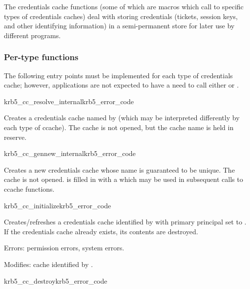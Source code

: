 The credentials cache functions (some of which are macros which call to
specific types of credentials caches) deal with storing credentials
(tickets, session keys, and other identifying information) in a
semi-permanent store for later use by different programs.

\subsubsection{Per-type functions}
The following entry points must be implemented for each type of
credentials cache; however, applications are not expected to have a need
to call either  or
.


\begin{funcdecl}{krb5_cc_resolve_internal}{krb5_error_code}{\funcout}
\funcin
{}
\end{funcdecl}

Creates a credentials cache named by  (which may be
interpreted differently by each type of ccache).  The cache is not
opened, but the cache name is held in reserve.

\begin{funcdecl}{krb5_cc_gennew_internal}{krb5_error_code}{\funcout}
\end{funcdecl}

Creates a new credentials cache whose name is guaranteed to be
unique.  The cache is not opened.  is
filled in with a  which may be used in subsequent
calls to ccache functions.

\begin{funcdecl}{krb5_cc_initialize}{krb5_error_code}{\funcinout}
\funcin
{}
\end{funcdecl}

Creates/refreshes a credentials cache identified by  with
primary principal set to .
If the credentials cache already exists, its contents are destroyed.

Errors:  permission errors, system errors.

Modifies: cache identified by .

\begin{funcdecl}{krb5_cc_destroy}{krb5_error_code}{\funcin}
\end{funcdecl}

